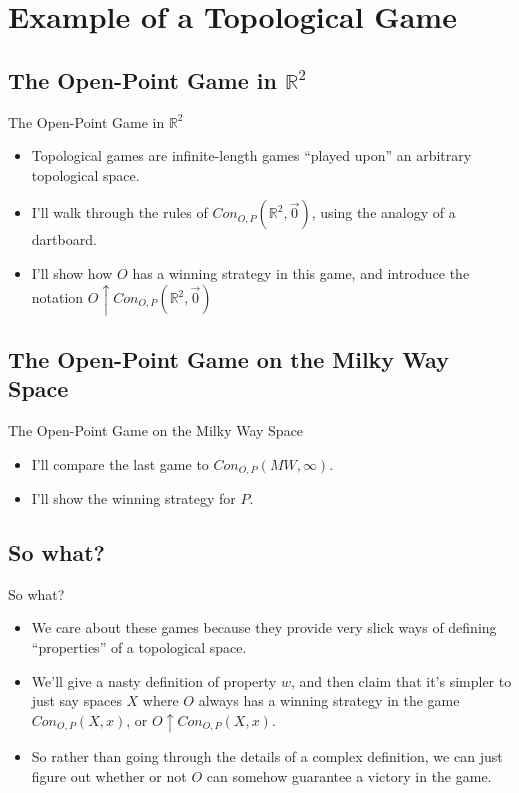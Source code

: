 \documentclass{beamer}
\begin{document}
\section{Example of a Topological Game}

\subsection{The Open-Point Game in $\mathbb{R}^2$}

\begin{frame}{The Open-Point Game in $\mathbb{R}^2$}
  
  \begin{itemize}
    \item
      Topological games are infinite-length games ``played upon'' an arbitrary topological space.
    \pause
    \item
      I'll walk through the rules of $Con_{O,P}(\mathbb{R}^2,\vec{0})$, using the analogy of a dartboard.
    \pause
    \item
      I'll show how $O$ has a winning strategy in this game, and introduce the notation $O \uparrow Con_{O,P}(\mathbb{R}^2,\vec{0})$
  \end{itemize}
\end{frame}

\subsection{The Open-Point Game on the Milky Way Space}

\begin{frame}{The Open-Point Game on the Milky Way Space}
  
  \begin{itemize}
    \item
      I'll compare the last game to $Con_{O,P}(MW,\infty)$.
    \pause
    \item
      I'll show the winning strategy for $P$.
  \end{itemize}

\end{frame}

\subsection{So what?}

\begin{frame}{So what?}
  \begin{itemize}
    \item
      We care about these games because they provide very slick ways of defining ``properties'' of a topological space.
    \pause
    \item
      We'll give a nasty definition of property $w$, and then claim that it's simpler to just say spaces $X$ where $O$ always has a winning strategy in the game $Con_{O,P}(X,x)$, or $O \uparrow Con_{O,P}(X,x)$.
    \pause
    \item
      So rather than going through the details of a complex definition, we can just figure out whether or not $O$ can somehow guarantee a victory in the game.
  \end{itemize}
\end{frame}
\end{document}
